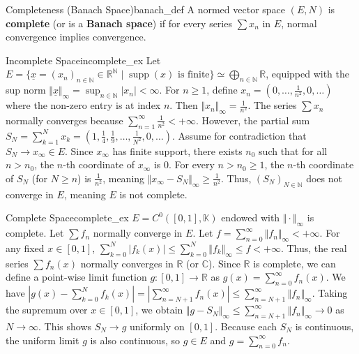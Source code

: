 \documentclass[11pt, a4paper]{article}
\newcommand{\R}{\mathbb{R}}
\newcommand{\N}{\mathbb{N}}
\newcommand{\C}{\mathbb{C}}
\DeclareMathOperator{\supp}{supp}
\begin{document}
\begin{definition}{Completeness (Banach Space)}{banach_def}
A normed vector space $(E, N)$ is \textbf{complete} (or is a \textbf{Banach space}) if for every series $\sum x_n$ in $E$, normal convergence implies convergence.
\end{definition}

\begin{example}{Incomplete Space}{incomplete_ex}
Let $E = \{\underline{x} = (x_n)_{n \in \N} \in \R^\N \mid \supp(x) \text{ is finite}\} \simeq \bigoplus_{n \in \N} \R$, equipped with the sup norm $\Vert \underline{x} \Vert_\infty = \sup_{n \in \N} |x_n| < \infty$.
For $n \ge 1$, define $x_n = (0, \dots, \frac{1}{n^2}, 0, \dots)$ where the non-zero entry is at index $n$.
Then $\Vert x_n \Vert_\infty = \frac{1}{n^2}$. The series $\sum x_n$ normally converges because $\sum_{n=1}^\infty \frac{1}{n^2} < +\infty$.
However, the partial sum $S_N = \sum_{k=1}^N x_k = (1, \frac{1}{4}, \frac{1}{9}, \dots, \frac{1}{N^2}, 0, \dots)$.
Assume for contradiction that $S_N \to x_\infty \in E$. Since $x_\infty$ has finite support, there exists $n_0$ such that for all $n > n_0$, the $n$-th coordinate of $x_\infty$ is 0.
For every $n > n_0 \ge 1$, the $n$-th coordinate of $S_N$ (for $N \ge n$) is $\frac{1}{n^2}$, meaning $\Vert x_\infty - S_N \Vert_\infty \ge \frac{1}{n^2}$. Thus, $(S_N)_{N \in \N}$ does not converge in $E$, meaning $E$ is not complete.
\end{example}

\begin{example}{Complete Space}{complete_ex}
$E = C^0([0,1], \mathbb{K})$ endowed with $\Vert \cdot \Vert_\infty$ is complete.
Let $\sum f_n$ normally converge in $E$. Let $f = \sum_{n=0}^\infty \Vert f_n \Vert_\infty < +\infty$.
For any fixed $x \in [0,1]$, $\sum_{k=0}^N |f_k(x)| \le \sum_{k=0}^N \Vert f_k \Vert_\infty \le f < +\infty$.
Thus, the real series $\sum f_n(x)$ normally converges in $\R$ (or $\C$). Since $\R$ is complete, we can define a point-wise limit function $g: [0,1] \to \R$ as $g(x) = \sum_{n=0}^\infty f_n(x)$.
We have $|g(x) - \sum_{k=0}^N f_k(x)| = \left|\sum_{n=N+1}^\infty f_n(x)\right| \le \sum_{n=N+1}^\infty \Vert f_n \Vert_\infty$.
Taking the supremum over $x \in [0,1]$, we obtain $\Vert g - S_N \Vert_\infty \le \sum_{n=N+1}^\infty \Vert f_n \Vert_\infty \to 0$ as $N \to \infty$.
This shows $S_N \to g$ uniformly on $[0,1]$. Because each $S_N$ is continuous, the uniform limit $g$ is also continuous, so $g \in E$ and $g = \sum_{n=0}^\infty f_n$.
\end{example}
\end{document}
